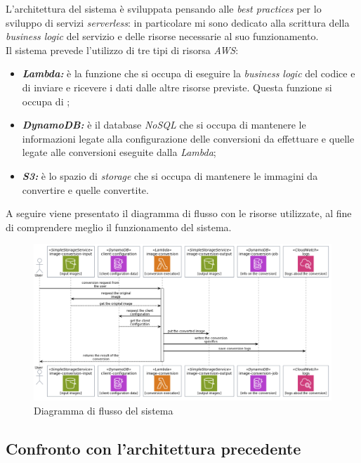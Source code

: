 L'architettura del sistema è sviluppata pensando alle \emph{best practices} per
lo sviluppo di servizi \emph{serverless}: in particolare mi sono dedicato alla
scrittura della \emph{business logic} del servizio e delle risorse necessarie al
suo funzionamento. \\
Il sistema prevede l'utilizzo di tre tipi di risorsa \emph{AWS}:
\begin{itemize}
      \item \textbf{\emph{Lambda:}} è la funzione che si occupa di eseguire la
            \emph{business logic} del codice e di inviare e ricevere i dati dalle altre risorse
            previste. Questa funzione si occupa di ;
      \item \textbf{\emph{DynamoDB:}} è il database \emph{NoSQL} che si occupa di
            mantenere le informazioni legate alla configurazione delle conversioni da
            effettuare e quelle legate alle conversioni eseguite dalla \emph{Lambda};
      \item \textbf{\emph{S3:}} è lo spazio di \emph{storage} che si occupa di
            mantenere le immagini da convertire e quelle convertite.
\end{itemize}

A seguire viene presentato il diagramma di flusso con le risorse utilizzate, al
fine di comprendere meglio il funzionamento del sistema.
\begin{figure}[H]
      \centering
      \includegraphics[width=1\textwidth]{images/diagramma-flusso.png}
      \caption{Diagramma di flusso del sistema}
      \label{fig:diagramma-flusso}
\end{figure}

\subsection{Confronto con l'architettura precedente}


